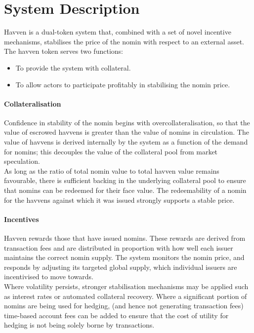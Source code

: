 \section{System Description} Havven is a dual-token system that, combined with a set of novel incentive mechanisms, stabilises the price of the nomin with respect to an external asset. \\

\noindent The havven token serves two functions:

\begin{itemize}
\item{To provide the system with collateral.}
\item{To allow actors to participate profitably in stabilising the nomin price.}
\end{itemize}

\paragraph{Collateralisation}

\noindent Confidence in stability of the nomin begins with overcollateralisation, so that the value of escrowed havvens is greater than the value of nomins in circulation. The value of havvens is derived internally by the system as a function of the demand for nomins; this decouples the value of the collateral pool from market speculation. \\

\noindent As long as the ratio of total nomin value to total havven value remains favourable, there is sufficient backing in the underlying collateral pool to ensure that nomins can be redeemed for their face value. The redeemability of a nomin for the havvens against which it was issued strongly supports a stable price.  

\paragraph{Incentives}

\noindent Havven rewards those that have issued nomins. These rewards are derived from transaction fees and are distributed in proportion with how well each issuer maintains the correct nomin supply. The system monitors the nomin price, and responds by adjusting its targeted global supply, which individual issuers are incentivised to move towards. \\

\noindent Where volatility persists, stronger stabilisation mechanisms may be applied such as interest rates or automated collateral recovery. Where a significant portion of nomins are being used for hedging, (and hence not generating transaction fees) time-based account fees can be added to ensure that the cost of utility for hedging is not being solely borne by transactions.

